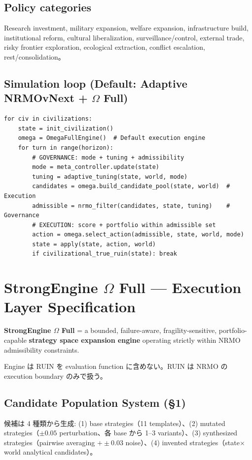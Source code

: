\documentclass[11pt,a4paper]{article}
\theoremstyle{definition}\newtheorem{definition}{Definition}[section]
\begin{document}
\subsection{Policy categories}
Research investment, military expansion, welfare expansion, infrastructure build, institutional reform, cultural liberalization, surveillance/control, external trade, risky frontier exploration, ecological extraction, conflict escalation, rest/consolidation。

\subsection{Simulation loop (Default: Adaptive NRMOvNext + $\Omega$ Full)}
\begin{lstlisting}
for civ in civilizations:
    state = init_civilization()
    omega = OmegaFullEngine()  # Default execution engine
    for turn in range(horizon):
        # GOVERNANCE: mode + tuning + admissibility
        mode = meta_controller.update(state)
        tuning = adaptive_tuning(state, world, mode)
        candidates = omega.build_candidate_pool(state, world)  # Execution
        admissible = nrmo_filter(candidates, state, tuning)    # Governance
        # EXECUTION: score + portfolio within admissible set
        action = omega.select_action(admissible, state, world, mode)
        state = apply(state, action, world)
        if civilizational_true_ruin(state): break
\end{lstlisting}


\section{StrongEngine $\Omega$ Full — Execution Layer Specification}

\begin{omegabox}
\textbf{StrongEngine $\Omega$ Full} = a bounded, failure-aware, fragility-sensitive, portfolio-capable \textbf{strategy space expansion engine} operating strictly within NRMO admissibility constraints.

Engine は RUIN を evaluation function に含めない。RUIN は NRMO の execution boundary のみで扱う。
\end{omegabox}

\subsection{Candidate Population System (\S1)}
候補は 4 種類から生成: (1) base strategies（11 templates）、(2) mutated strategies（$\pm 0.05$ perturbation、各 base から 1--3 variants）、(3) synthesized strategies（pairwise averaging $+ \pm 0.03$ noise）、(4) invented strategies（state$\times$world analytical candidates）。
\end{document}
